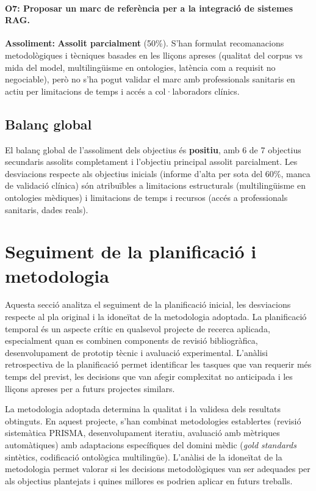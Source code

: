 \documentclass[CAT]{TFUOC}%
\begin{document}
\paragraph{O7: Proposar un marc de referència per a la integració de sistemes RAG.}
\textbf{Assoliment:} \textbf{Assolit parcialment} (50\%). S'han formulat recomanacions metodològiques i tècniques basades en les lliçons apreses (qualitat del corpus vs mida del model, multilingüisme en ontologies, latència com a requisit no negociable), però no s'ha pogut validar el marc amb professionals sanitaris en actiu per limitacions de temps i accés a col·laboradors clínics.

\subsection{Balanç global}

El balanç global de l'assoliment dels objectius és \textbf{positiu}, amb 6 de 7 objectius secundaris assolits completament i l'objectiu principal assolit parcialment. Les desviacions respecte als objectius inicials (informe d'alta per sota del 60\%, manca de validació clínica) són atribuïbles a limitacions estructurals (multilingüisme en ontologies mèdiques) i limitacions de temps i recursos (accés a professionals sanitaris, dades reals).

\section{Seguiment de la planificació i metodologia}

Aquesta secció analitza el seguiment de la planificació inicial, les desviacions respecte al pla original i la idoneïtat de la metodologia adoptada. La planificació temporal és un aspecte crític en qualsevol projecte de recerca aplicada, especialment quan es combinen components de revisió bibliogràfica, desenvolupament de prototip tècnic i avaluació experimental. L'anàlisi retrospectiva de la planificació permet identificar les tasques que van requerir més temps del previst, les decisions que van afegir complexitat no anticipada i les lliçons apreses per a futurs projectes similars.

La metodologia adoptada determina la qualitat i la validesa dels resultats obtinguts. En aquest projecte, s'han combinat metodologies establertes (revisió sistemàtica PRISMA, desenvolupament iteratiu, avaluació amb mètriques automàtiques) amb adaptacions específiques del domini mèdic (\textit{gold standards} sintètics, codificació ontològica multilingüe). L'anàlisi de la idoneïtat de la metodologia permet valorar si les decisions metodològiques van ser adequades per als objectius plantejats i quines millores es podrien aplicar en futurs treballs.
\end{document}
